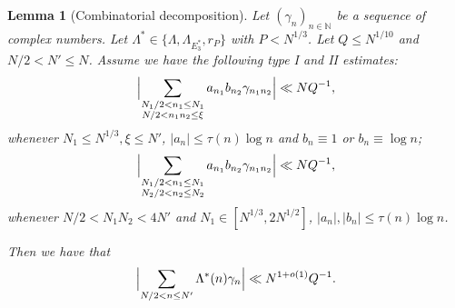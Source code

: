 \documentclass[12pt]{amsart}
\newtheorem{lemma}[theorem]{Lemma}
\theoremstyle{definition}
\theoremstyle{remark}
\numberwithin{equation}{section}
\newcommand{\1}{\mathbf{1}}
\newcommand{\N}{{\mathbb N}}
\begin{document}
\begin{lemma}[Combinatorial decomposition]\label{lem:combdecomp1}
Let $(\gamma_n)_{n\in\N}$ be a sequence of complex numbers. Let $\Lambda^* \in\{\Lambda,\Lambda_{E_3^*},r_{P} \}$ with $P<N^{1/3}$. Let $Q\leq N^{1/10}$ and $N/2<N'\leq N$. Assume we have the following type I and II estimates:
\begin{align*}
    \Bigl|\sum_{\substack{N_1/2 < n_1 \leq N_1\\ N/2<n_1n_2\leq \xi}} a_{n_1} b_{n_2} \gamma_{n_1 n_2}\Bigr|\ll N Q^{-1},
\end{align*}
 whenever $N_1\leq N^{1/3}, \xi \leq N'$, $|a_n|\leq  \tau(n)\log n$ and $b_n\equiv 1$ or $b_n\equiv \log n$;
 \begin{align*}
    \Bigl|\sum_{\substack{N_1/2 < n_1 \leq N_1\\ N_2/2 <  n_2 \leq N_2}} a_{n_1} b_{n_2} \gamma_{n_1 n_2}\Bigr|\ll N Q^{-1},
\end{align*}
whenever $N/2<N_1N_2<4N'$ and $N_1\in [N^{1/3},2N^{1/2}]$, $|a_n|,|b_n|\leq \tau(n)\log n$.

Then we have that
\begin{align*}
   \Bigl |\sum_{N/2<n\leq N'}\Lambda^*(n)\gamma_{n}\Bigr| \ll N^{1+o(1)} Q^{-1}.
\end{align*}
\end{lemma}
\end{document}
